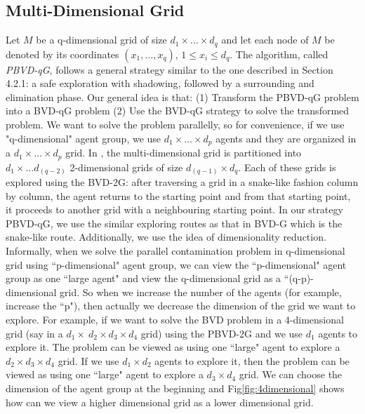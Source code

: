 \subsection{Multi-Dimensional Grid}
Let $M$ be a q-dimensional grid of size $d_1\times\ldots\times d_q$ and let each node of $M$ be denoted by its coordinates $(x_1,\ldots,x_q)$, $1\leq x_i\leq d_q$. The algorithm, called {\em PBVD-qG}, follows a general strategy similar to the one described in Section 4.2.1: a safe exploration with shadowing, followed by a surrounding and elimination phase. Our general idea is that: (1) Transform the PBVD-qG problem into a BVD-qG problem (2) Use the BVD-qG strategy to solve the transformed problem. We want to solve the problem parallelly, so for convenience, if we use "q-dimensional" agent group, we use $d_1\times \ldots \times d_p$ agents and they are organized in a $d_1\times \ldots \times d_p$ grid. 
In \cite{Cai}, the multi-dimensional grid is partitioned into $d_1\times \ldots d_(q-2)$ 2-dimensional grids of size $d_(q-1) \times d_q$. Each of these grids is explored using the BVD-2G: after traversing a grid in a snake-like fashion column by column, the agent returns to the starting point and from that starting point, it proceeds to another grid with a neighbouring starting point. In our strategy PBVD-qG, we use the similar exploring routes as that in BVD-G which is the snake-like route. Additionally, we use the idea of dimensionality reduction. Informally, when we solve the parallel contamination problem in q-dimensional grid using ``p-dimensional" agent group, we can view the ``p-dimensional" agent group as one ``large agent" and view the q-dimensional grid as a ``(q-p)-dimensional grid. So when we increase the number of the agents (for example, increase the ``p"), then actually we decrease the dimension of the grid we want to explore. For example, if we want to solve the BVD problem in a 4-dimensional grid (say in a $d_1\times\ d_2 \times d_3\times d_4$ grid) using the PBVD-2G and we use $d_1$ agents to explore it. The problem can be viewed as using one ``large" agent to explore a $d_2\times d_3\times d_4$ grid. If we use $d_1\times d_2$ agents to explore it, then the problem can be viewed as using one ``large" agent to explore a $d_3 \times d_4$ grid. We can choose the dimension of the agent group at the beginning and Fig\ref{fig:4dimensional} shows how can we view a higher dimensional grid as a lower dimensional grid. 

